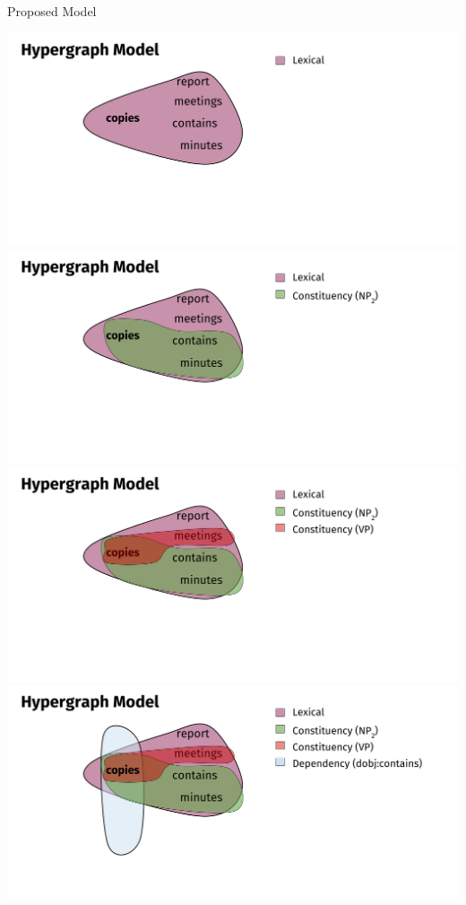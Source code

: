 \documentclass[10pt,xcolor=table]{beamer}
\begin{document}
\begin{frame}{Proposed Model}
	
	\begin{overprint}
	\includegraphics[width=1\linewidth]{image2/Chapitre2/hyper_network_ex_1.pdf}%
	\onslide<3>\includegraphics[width=1\linewidth]{image2/Chapitre2/hyper_network_ex_2.pdf}%
	\onslide<4>\includegraphics[width=1\linewidth]{image2/Chapitre2/hyper_network_ex_3.pdf}%
	\onslide<5>\includegraphics[width=1\linewidth]{image2/Chapitre2/hyper_network_ex_4.pdf}%

\end{overprint}
\end{frame}
\end{document}
